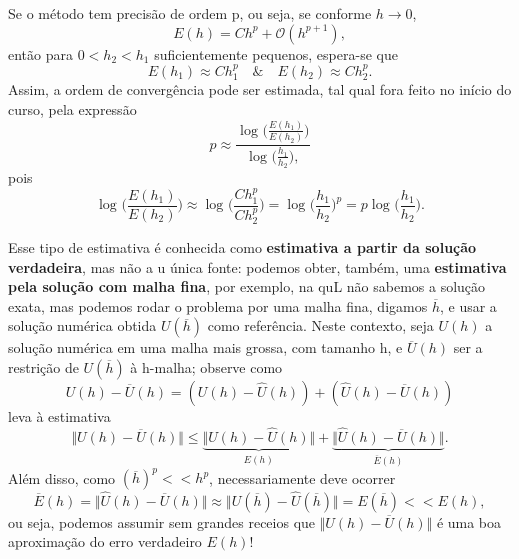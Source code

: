 \documentclass[../differential_methods.tex]{subfiles}
\begin{document}
Se o método tem precisão de ordem p, ou seja, se conforme \(h\to 0\),
\[
	E(h)=Ch^{p}+\mathcal{O}(h^{p+1}),
\]
então para \(0<h_2<h_1\) suficientemente pequenos, espera-se que
\[
	E(h_{1})\approx Ch_{1}^{p} \quad\&\quad E(h_{2})\approx Ch_{2}^{p}.
\]
Assim, a ordem de convergência pode ser estimada, tal qual fora feito no início do curso, pela expressão
\[
	p\approx \frac{\log^{}{\biggl(\frac{E(h_1)}{E(h_2)}\biggr)}}{\log^{}{\biggl(\frac{h_1}{h_2}\biggr)},}
\]
pois
\[
	\log^{}{\biggl(\frac{E(h_1)}{E(h_2)}\biggr)}\approx \log^{}{\biggl(\frac{Ch_{1}^{p}}{Ch_{2}^{p}}\biggr)}=\log^{}{\biggl(\frac{h_1}{h_2}\biggr)^{p}}=p\log^{}{\biggl(\frac{h_1}{h_2}\biggr)}.
\]

Esse tipo de estimativa é conhecida como \textbf{estimativa a partir da solução verdadeira}, mas não a u única fonte: podemos obter, também, uma \textbf{estimativa pela solução com malha fina}, por exemplo, na quL não sabemos a solução exata, mas podemos rodar o problema por uma malha fina, digamos \(\overline{h}\), e usar a solução numérica obtida \(U(\overline{h})\) como referência.
Neste contexto, seja \(U(h)\) a solução numérica em uma malha mais grossa, com tamanho h, e \(\overline{U}(h)\) ser a restrição de \(U(\overline{h})\) à h-malha; observe como
\[
	U(h)-\overline{U}(h)=(U(h)-\hat{U}(h))+(\hat{U}(h)-\overline{U}(h))
\]
leva à estimativa
\[
	\Vert U(h)-\overline{U}(h) \Vert \leq \underbrace{\Vert U(h)-\hat{U}(h) \Vert}_{E(h)} + \underbrace{\Vert \hat{U}(h)-\overline{U}(h) \Vert}_{\overline{E}(h)}.
\]
Além disso, como \((\overline{h})^{p}<<h^{p}\), necessariamente deve ocorrer
\[
	\overline{E}(h)=\Vert \hat{U}(h)-\overline{U}(h) \Vert \approx \Vert U(\overline{h})-\hat{U}(\overline{h}) \Vert = E(\overline{h})<<E(h),
\]
ou seja, podemos assumir sem grandes receios que \(\Vert U(h)-\overline{U}(h) \Vert\) é uma boa aproximação do erro verdadeiro \(E(h)\)!
\end{document}
